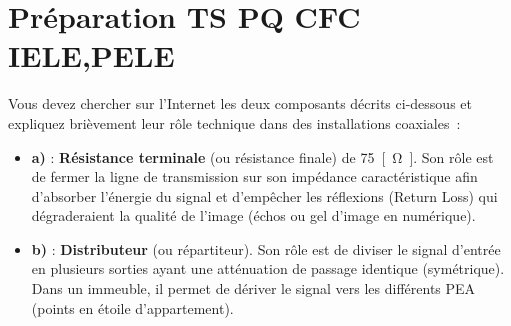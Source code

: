 \documentclass[a4paper,12pt,answers,addpoints]{exam}
\begin{document}
	\unframedsolutions
	\pointsinmargin
	\bracketedpoints
	
\section*{Préparation TS PQ CFC IELE,PELE}
\begin{questions}
\question 

Vous devez chercher sur l'Internet les deux composants décrits ci-dessous et expliquez brièvement leur rôle technique dans des installations coaxiales~:


\begin{solution}


\begin{itemize}
    \item \textbf{a)} : \textbf{Résistance terminale} (ou résistance finale) de \qty{75}{[\ohm]}. Son rôle est de fermer la ligne de transmission sur son impédance caractéristique afin d'absorber l'énergie du signal et d'empêcher les réflexions (Return Loss) qui dégraderaient la qualité de l'image (échos ou gel d'image en numérique).
    \item \textbf{b)} : \textbf{Distributeur} (ou répartiteur). Son rôle est de diviser le signal d'entrée en plusieurs sorties ayant une atténuation de passage identique (symétrique). Dans un immeuble, il permet de dériver le signal vers les différents PEA (points en étoile d'appartement).
\end{itemize}



\end{solution}
\end{questions}
\end{document}
